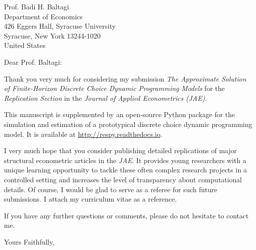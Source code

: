 \documentclass[13pt]{letter}
\begin{document}
\begin{letter}{Prof. Badi H. Baltagi \\Department of Economics \\
426 Eggers Hall, Syracuse University \\
Syracuse, New York 13244-1020\\
United States }

\opening{Dear Prof. Baltagi:}

Thank you very much for considering my submission \textit{The Approximate Solution of Finite-Horizon Discrete Choice Dynamic Programming Models} for the \textit{Replication Section} in the \textit{Journal of Applied Econometrics (JAE)}.

This manuscript is supplemented by an open-source Python package for the simulation and estimation of a prototypical discrete choice dynamic programming model. It is available at \url{http://respy.readthedocs.io}.

I very much hope that you consider publishing detailed replications of major structural econometric articles in the \textit{JAE}. It provides young researchers with a unique learning opportunity to tackle these often complex research projects in a controlled setting and increases the level of transparency about computational details. Of course, I would be glad to serve as a referee for such future submissions. I attach my curriculum vitae as a reference.

If you have any further questions or comments, please do not hesitate to contact me.\newline

\closing{Yours Faithfully,}\vspace{0.5cm}

\end{letter}
\end{document}
